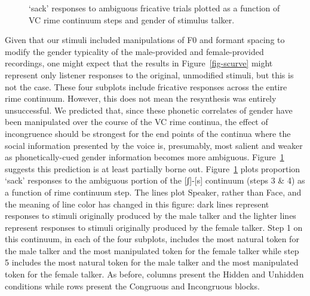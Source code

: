 \documentclass[
  letterpaper,
  DIV=11,
  numbers=noendperiod]{scrartcl}
\begin{document}
\begin{figure}


\caption{\label{fig-rimes}`sack' responses to ambiguous fricative trials
plotted as a function of VC rime continuum steps and gender of stimulus
talker.}

\end{figure}%

Given that our stimuli included manipulations of F0 and formant spacing
to modify the gender typicality of the male-provided and female-provided
recordings, one might expect that the results in Figure~\ref{fig-scurve}
might represent only listener responses to the original, unmodified
stimuli, but this is not the case. These four subplots include fricative
responses across the entire rime continuum. However, this does not mean
the resynthesis was entirely unsuccessful. We predicted that, since
these phonetic correlates of gender have been manipulated over the
course of the VC rime continua, the effect of incongruence should be
strongest for the end points of the continua where the social
information presented by the voice is, presumably, most salient and
weaker as phonetically-cued gender information becomes more ambiguous.
Figure~\ref{fig-rimes} suggests this prediction is at least partially
borne out. Figure~\ref{fig-rimes} plots proportion `sack' responses to
the ambiguous portion of the {[}ʃ{]}-{[}s{]} continuum (steps 3 \& 4) as
a function of rime continuum step. The lines plot Speaker, rather than
Face, and the meaning of line color has changed in this figure: dark
lines represent responses to stimuli originally produced by the male
talker and the lighter lines represent responses to stimuli originally
produced by the female talker. Step 1 on this continuum, in each of the
four subplots, includes the most natural token for the male talker and
the most manipulated token for the female talker while step 5 includes
the most natural token for the male talker and the most manipulated
token for the female talker. As before, columns present the Hidden and
Unhidden conditions while rows present the Congruous and Incongruous
blocks.
\end{document}
